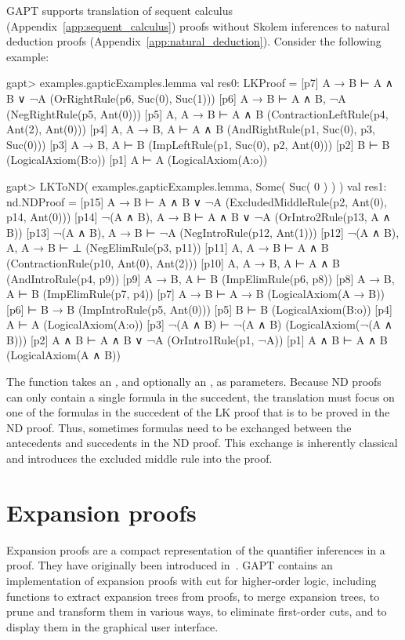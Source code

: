 \documentclass[a4paper,11pt]{book}
\newcommand{\cli}[1]{{\ttfamily {#1}}}
\begin{document}
GAPT supports translation of sequent calculus
(Appendix~\ref{app:sequent_calculus}) proofs without Skolem inferences
to natural deduction proofs (Appendix~\ref{app:natural_deduction}).
Consider the following example:
\begin{clilisting}
gapt> examples.gapticExamples.lemma
val res0: LKProof = [p7] A → B ⊢ A ∧ B ∨ ¬A    (OrRightRule(p6, Suc(0), Suc(1)))
[p6] A → B ⊢ A ∧ B, ¬A    (NegRightRule(p5, Ant(0)))
[p5] A, A → B ⊢ A ∧ B    (ContractionLeftRule(p4, Ant(2), Ant(0)))
[p4] A, A → B, A ⊢ A ∧ B    (AndRightRule(p1, Suc(0), p3, Suc(0)))
[p3] A → B, A ⊢ B    (ImpLeftRule(p1, Suc(0), p2, Ant(0)))
[p2] B ⊢ B    (LogicalAxiom(B:o))
[p1] A ⊢ A    (LogicalAxiom(A:o))

gapt> LKToND( examples.gapticExamples.lemma, Some( Suc( 0 ) ) )
val res1: nd.NDProof = [p15] A → B ⊢ A ∧ B ∨ ¬A    (ExcludedMiddleRule(p2, Ant(0), p14, Ant(0)))
[p14] ¬(A ∧ B), A → B ⊢ A ∧ B ∨ ¬A    (OrIntro2Rule(p13, A ∧ B))
[p13] ¬(A ∧ B), A → B ⊢ ¬A    (NegIntroRule(p12, Ant(1)))
[p12] ¬(A ∧ B), A, A → B ⊢ ⊥    (NegElimRule(p3, p11))
[p11] A, A → B ⊢ A ∧ B    (ContractionRule(p10, Ant(0), Ant(2)))
[p10] A, A → B, A ⊢ A ∧ B    (AndIntroRule(p4, p9))
[p9] A → B, A ⊢ B    (ImpElimRule(p6, p8))
[p8] A → B, A ⊢ B    (ImpElimRule(p7, p4))
[p7] A → B ⊢ A → B    (LogicalAxiom(A → B))
[p6]  ⊢ B → B    (ImpIntroRule(p5, Ant(0)))
[p5] B ⊢ B    (LogicalAxiom(B:o))
[p4] A ⊢ A    (LogicalAxiom(A:o))
[p3] ¬(A ∧ B) ⊢ ¬(A ∧ B)    (LogicalAxiom(¬(A ∧ B)))
[p2] A ∧ B ⊢ A ∧ B ∨ ¬A    (OrIntro1Rule(p1, ¬A))
[p1] A ∧ B ⊢ A ∧ B    (LogicalAxiom(A ∧ B))

\end{clilisting}
The \cli{LKToND} function takes an \cli{LKProof}, and optionally an
\cli{Option[SequentIndex]}, as parameters.  Because ND proofs can only
contain a single formula in the succedent, the translation must focus on one
of the formulas in the succedent of the LK proof that is to be proved in the ND
proof.
Thus, sometimes formulas need to be exchanged between the antecedents and
succedents in the ND proof. This exchange is inherently classical and introduces
the excluded middle rule into the proof.

\section{Expansion proofs}

Expansion proofs are a compact representation of the quantifier inferences in a
proof.  They have originally been introduced in~\cite{Miller87Compact}.  GAPT
contains an implementation of expansion proofs with cut for higher-order logic,
including functions to extract expansion trees from proofs, to merge expansion
trees, to prune and transform them in various ways, to eliminate first-order
cuts, and to display them in the graphical user interface.
\end{document}
